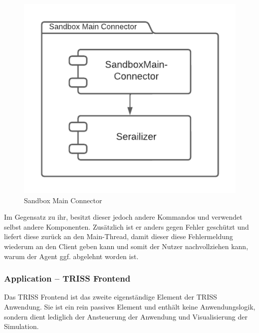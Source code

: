\begin{figure}[htb]
    \centering
    \includegraphics[scale=.65,center]{medien/sandbox-main-connector.pdf}
    \caption{Sandbox Main Connector}
    \ownsource
    \label{fig:sandbox-main-connector}
\end{figure}

\FloatBarrier

Im Gegensatz zu ihr, besitzt dieser jedoch andere Kommandos und verwendet selbst andere Komponenten.
Zusätzlich ist er anders gegen Fehler geschützt und liefert diese zurück an den Main-Thread, damit dieser diese Fehlermeldung wiederum an den Client geben kann und somit der Nutzer nachvollziehen kann, warum der Agent ggf. abgelehnt worden ist.

\subsubsection{Application – TRISS Frontend}
\label{sec:triss-frontend-component}

Das TRISS Frontend ist das zweite eigenständige Element der TRISS Anwendung.
Sie ist ein rein passives Element und enthält keine Anwendungslogik, sondern dient lediglich der Ansteuerung der Anwendung und Visualisierung der Simulation.

